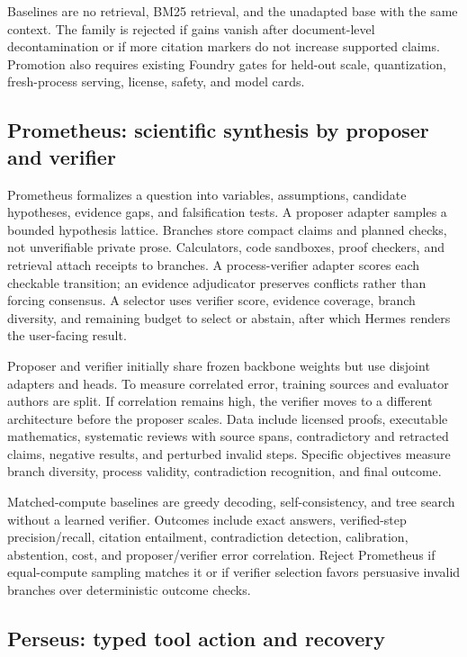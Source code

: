 \documentclass[10pt]{article}
\begin{document}
Baselines are no retrieval, BM25 retrieval, and the unadapted base with the same
context. The family is rejected if gains vanish after document-level
decontamination or if more citation markers do not increase supported claims.
Promotion also requires existing Foundry gates for held-out scale,
quantization, fresh-process serving, license, safety, and model cards.

\subsection{Prometheus: scientific synthesis by proposer and verifier}

Prometheus formalizes a question into variables, assumptions, candidate
hypotheses, evidence gaps, and falsification tests. A proposer adapter samples a
bounded hypothesis lattice. Branches store compact claims and planned checks,
not unverifiable private prose. Calculators, code sandboxes, proof checkers, and
retrieval attach receipts to branches. A process-verifier adapter scores each
checkable transition; an evidence adjudicator preserves conflicts rather than
forcing consensus. A selector uses verifier score, evidence coverage, branch
diversity, and remaining budget to select or abstain, after which Hermes renders
the user-facing result.

Proposer and verifier initially share frozen backbone weights but use disjoint
adapters and heads. To measure correlated error, training sources and evaluator
authors are split. If correlation remains high, the verifier moves to a
different architecture before the proposer scales. Data include licensed
proofs, executable mathematics, systematic reviews with source spans,
contradictory and retracted claims, negative results, and perturbed invalid
steps. Specific objectives measure branch diversity, process validity,
contradiction recognition, and final outcome.

Matched-compute baselines are greedy decoding, self-consistency, and tree search
without a learned verifier. Outcomes include exact answers, verified-step
precision/recall, citation entailment, contradiction detection, calibration,
abstention, cost, and proposer/verifier error correlation. Reject Prometheus if
equal-compute sampling matches it or if verifier selection favors persuasive
invalid branches over deterministic outcome checks.

\subsection{Perseus: typed tool action and recovery}
\end{document}

